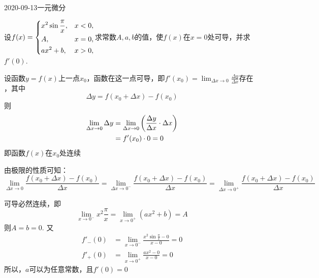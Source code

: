 \documentclass{ctexart}
\begin{document}
\begin{mathques}{2020-09-13}{一元微分}
\begin{ques}
  设$f(x) =
  \begin{dcases}
    x^2 \sin \frac{\pi}{x}, & x < 0, \\
    A, & x = 0, \\
    ax^2 + b, & x > 0,\\
  \end{dcases}
  $求常数$A, a, b$的值，使$f(x)$在$x = 0$处可导，并求$f'(0)$.
\end{ques}
\begin{solu}
  \begin{mathideabox}
    设函数$y = f(x)$上一点$x_0$，函数在这一点可导，即$f'(x_0) = \lim_{\Delta x
    \to 0} \frac{\Delta y}{\Delta x}存在$，其中
    \[
      \Delta y = f(x_0 + \Delta x) - f(x_0)
    \]
    则
    \begin{align*}
      \lim_{\Delta x \to 0} \Delta y &= \lim_{\Delta x \to 0} \qty(\frac{\Delta
      y}{\Delta x}\cdot \Delta x)\\
      &= f'(x_0) \cdot 0 = 0
    \end{align*}
    即函数$f(x)$在$x_0$处连续
  \end{mathideabox}
  \begin{mathideabox}[导数存在必然有左右导数相等]
    由极限的性质可知：
    \[
      \lim_{\Delta x \to 0} \frac{f(x_0 + \Delta x) - f(x_0)}{\Delta x}
      =\lim_{\Delta x \to 0^-} \frac{f(x_0 + \Delta x) - f(x_0)}{\Delta x}
      =\lim_{\Delta x \to 0^+} \frac{f(x_0 + \Delta x) - f(x_0)}{\Delta x}
    \]
  \end{mathideabox}
  可导必然连续，即
  \[
    \lim_{x \to 0^-} x^2 \frac{\pi}{x} = \lim_{x \to 0^+} (ax^2 + b) = A
  \]
  则$A = b = 0$.
  又
  \begin{align*}
    f'_-(0) &= \lim_{x \to 0^-} \frac{x^2 \sin \frac{\pi}{x} - 0}{x - 0} = 0\\
    f'_+(0) &= \lim_{x \to 0^+} \frac{ax^2 - 0}{x - 0} = 0
  \end{align*}
  所以，$a$可以为任意常数，且$f'(0) = 0$
\end{solu}
\end{mathques}
\end{document}
